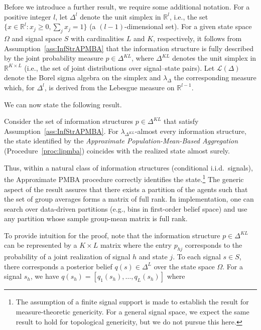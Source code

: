 \documentclass[12pt,reqno]{amsart}
\begin{document}
Before we introduce a further result, we require some additional notation. For a positive integer $l$, let $\Delta^l$ denote the unit simplex in $\mathbb{R}^l$, i.e., the set $\{x \in \mathbb{R}^l : x_j \geq 0, \sum_j x_j = 1\}$ (a $(l-1)$-dimensional set). For a given state space $\Omega$ and signal space $S$
with cardinalities $L$ and $K$, respectively, it follows from Assumption~\ref{ass:InfStrAPMBA} that the information structure is fully
described by the joint probability measure $p \in \Delta^{KL}$, where
$\Delta^{KL}$ denotes the unit simplex in $\mathbb{R}^{K \times L}$ (i.e., the set of joint distributions over signal--state pairs). Let $\mathcal{L}(\Delta)$ denote the Borel sigma algebra on the simplex and
$\lambda_\Delta$ the corresponding measure which, for $\Delta^l$, is derived from the Lebesgue measure on $\mathbb{R}^{l-1}$.




\par

We can now state the following result.

\begin{theorem}\label{theorem:GenericAggregation}
Consider the set of information structures $p \in \Delta^{KL}$ that satisfy Assumption~\ref{ass:InfStrAPMBA}. For $\lambda_{\Delta^{KL}}$-almost every information structure, the state identified by the \emph{Approximate Population-Mean-Based Aggregation} (Procedure~\ref{proc:lipmba}) coincides with the realized  state almost surely.
\end{theorem}

Thus, within a natural class of information structures (conditional i.i.d.\ signals), the Approximate PMBA procedure correctly identifies the state.\footnote{The assumption of a finite signal support is made to establish the result for measure-theoretic genericity. For a general signal space,  we expect the same result to hold for topological genericity, but we do not pursue this here.} The generic aspect of the result assures that there exists a partition of the agents such that the set of group averages forms a matrix of full rank. In implementation, one can search over data-driven partitions (e.g., bins in first-order belief space) and use any partition whose sample group-mean matrix is full rank.
\par
To provide intuition for the proof, note that the information structure $p \in \Delta^{KL}$ can be represented by a $K \times L$
matrix where the entry $p_{hj}$ corresponds to the probability of a joint realization of signal $h$
and state $j$. To each signal $s \in S$, there corresponds a posterior belief 
$q(s) \in \Delta^L$ over the state space $\Omega$. For a signal $s_h$, we have 
$q(s_h) = [q_1(s_h), \ldots, q_L(s_h)]$ where
\end{document}

